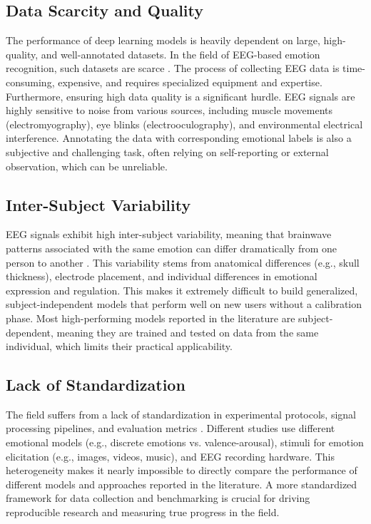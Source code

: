 \documentclass[conference]{IEEEtran}
\begin{document}
\subsection*{Data Scarcity and Quality}
The performance of deep learning models is heavily dependent on large, high-quality, and well-annotated datasets. In the field of EEG-based emotion recognition, such datasets are scarce \cite{b8}. The process of collecting EEG data is time-consuming, expensive, and requires specialized equipment and expertise. Furthermore, ensuring high data quality is a significant hurdle. EEG signals are highly sensitive to noise from various sources, including muscle movements (electromyography), eye blinks (electrooculography), and environmental electrical interference. Annotating the data with corresponding emotional labels is also a subjective and challenging task, often relying on self-reporting or external observation, which can be unreliable.

\subsection*{Inter-Subject Variability}
EEG signals exhibit high inter-subject variability, meaning that brainwave patterns associated with the same emotion can differ dramatically from one person to another \cite{b7}. This variability stems from anatomical differences (e.g., skull thickness), electrode placement, and individual differences in emotional expression and regulation. This makes it extremely difficult to build generalized, subject-independent models that perform well on new users without a calibration phase. Most high-performing models reported in the literature are subject-dependent, meaning they are trained and tested on data from the same individual, which limits their practical applicability.

\subsection*{Lack of Standardization}
The field suffers from a lack of standardization in experimental protocols, signal processing pipelines, and evaluation metrics \cite{b6}. Different studies use different emotional models (e.g., discrete emotions vs. valence-arousal), stimuli for emotion elicitation (e.g., images, videos, music), and EEG recording hardware. This heterogeneity makes it nearly impossible to directly compare the performance of different models and approaches reported in the literature. A more standardized framework for data collection and benchmarking is crucial for driving reproducible research and measuring true progress in the field.
\end{document}
